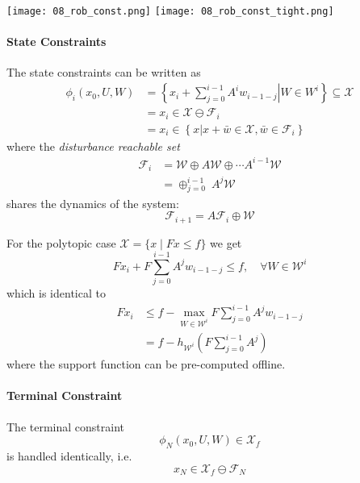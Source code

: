 \begin{center}
    \texttt{[image: 08\_rob\_const.png]}
    \texttt{[image: 08\_rob\_const\_tight.png]}
\end{center}

\paragraph{State Constraints}
The state constraints can be written as
\begin{align*}
    \phi_i(x_0,U,W) & =\left\{\left.x_i+\sum_{j=0}^{i-1}A^i w_{i-1-j}\right|W\in W^i\right\}\subseteq\mathcal{X} \\
                    & = x_i \in \mathcal{X} \ominus \mathcal{F}_i                                                \\
                    & = x_i \in \left\{x | x+\bar{w}\in \mathcal{X}, \bar{w}\in \mathcal{F}_i\right\}
\end{align*}
where the \textit{disturbance reachable set}
\begin{align*}
    \mathcal{F}_i & = \mathcal{W} \oplus A \mathcal{W} \oplus \cdots A^{i-1} \mathcal{W} \\
                  & = \oplus_{j=0}^{i-1}\; A^{j} \mathcal{W}
\end{align*}
shares the dynamics of the system:
\begin{equation*}
    \mathcal{F}_{i+1} = A\mathcal{F}_i \oplus \mathcal{W}
\end{equation*}
\newpar{}

For the polytopic case $\mathcal{X} = \{x \mid Fx \leq f\}$ we get
\begin{equation*}
    Fx_i + F \sum_{j=0}^{i-1} A^j w_{i-1-j} \leq f, \quad \forall W \in \mathcal{W}^i
\end{equation*}
which is identical to
\begin{align*}
    Fx_i & \leq f - \max_{W \in \mathcal{W}^i} F \sum_{j=0}^{i-1} A^j w_{i-1-j} \\
         & = f - h_{\mathcal{W}^i} \left(F \sum_{j=0}^{i-1} A^j\right)
\end{align*}
where the support function can be pre-computed offline.
\paragraph{Terminal Constraint}
The terminal constraint
\begin{equation*}
    \phi_N(x_0, U, W)\in \mathcal{X}_f
\end{equation*}
is handled identically, i.e.\
\begin{equation*}
    x_N \in \mathcal{X}_f \ominus \mathcal{F}_N
\end{equation*}

